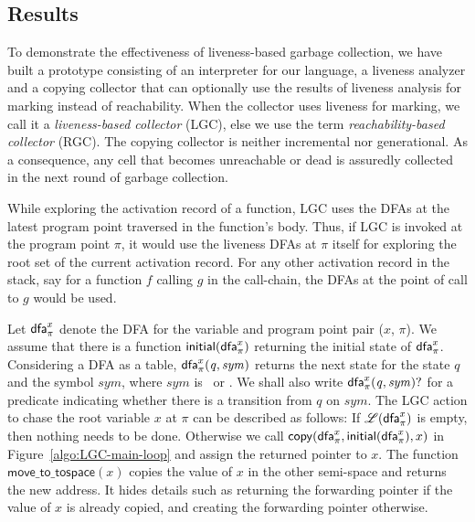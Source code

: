 \documentclass[9pt]{sigplanconf}
\begin{document}
\begin{enumerate}
\section{Results}
To demonstrate the effectiveness of liveness-based garbage collection,
we  have  built a  prototype  consisting  of  an interpreter  for  our
language,  a  liveness  analyzer  and  a copying  collector  that  can
optionally use the results of liveness analysis for marking instead of
reachability. When the collector uses liveness for marking, we call it
a  {\em liveness-based  collector} (LGC),  else we  use the  term {\em
  reachability-based  collector}  (RGC).   The  copying  collector  is
neither incremental nor generational.  As a consequence, any cell that
becomes unreachable or  dead is assuredly collected in  the next round
of garbage collection.

While exploring the activation record of a function, LGC uses the DFAs
at  the latest  program  point traversed  in the function's body.  Thus, if  LGC
is invoked  at the program point   $\pi$,  it would  use  the
liveness  DFAs at  $\pi$ itself for exploring the root set of the
current activation record. For any other activation record in the
stack, say for a function ${\mathit f}$ calling ${\mathit g}$ in the call-chain,
the DFAs at the point of call to  ${\mathit g}$ would be used.

Let $\mathsf{dfa}_{{\pi}}^{x}$  denote the DFA  for the variable  and program
point  pair ($x$,  $\pi$).  We  assume that  there is  a function
$\mathsf{initial}(\mathsf{dfa}_{{\pi}}^{x})$  returning the initial  state of
$\mathsf{dfa}_{{\pi}}^{x}$.    
Considering   a   DFA   as   a   table,
$\mathsf{dfa}_{{\pi}}^{x}\mathit{(q,sym)}$  returns the  next  state for  the
state $q$ and the  symbol $\mathit{sym}$, where $\mathit{sym}$ is
\acar\      or     \acdr.       We      shall     also      write
$\mathsf{dfa}_{{\pi}}^{x}\mathit{(q,sym)\mathsf{?}}$    for    a    predicate
indicating  whether there  is a  transition from  $q$ on
$\mathit{sym}$.  The LGC action to chase the root variable $x$ at
$\pi$ can be described as  follows: If $\mathscr{L}(\mathsf{dfa}_{{\pi}}^{x})$ is
empty,  then  nothing  needs  to  be  done.   Otherwise  we  call
$\mathsf{copy}(\mathsf{dfa}_{{\pi}}^{x},\mathsf{initial}(\mathsf{dfa}_{{\pi}}^{x}),    x)$
in   Figure~\ref{algo:LGC-main-loop}  and  assign   the  returned
pointer to $x$.
The function $\mathsf{move\_to\_tospace}(x)$  copies the value of
$x$  in the  other semi-space  and returns  the new  address.  It
hides  details such as  returning the  forwarding pointer  if the
value  of $x$  is  already copied,  and  creating the  forwarding
pointer otherwise.


\end{enumerate}
\end{document}
